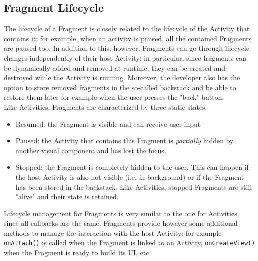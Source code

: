 \documentclass[11pt,a4paper,notitlepage]{article}
\begin{document}
\subsection{Fragment Lifecycle}
The lifecycle of a Fragment is closely related to the lifecycle of the Activity that contains it: for example, when an activity is paused, all the contained Fragments are paused too. In addition to this, however, Fragments can go through lifecycle changes independently of their host Activity: in particular, since fragments can be dynamically added and removed at runtime, they can be created and destroyed while the Activity is running. Moreover, the developer also has the option to store removed fragments in the so-called backstack and be able to restore them later for example when the user presses the "back" button.\smallskip \\
Like Activities, Fragments are characterized by three static states:
\begin{itemize}
	\item Resumed: the Fragment is visible and can receive user input
	\item Paused: the Activity that contains this Fragment is \textit{partially} hidden by another visual component and has lost the focus.
	\item Stopped: the Fragment is completely hidden to the user. This can happen if the host Activity is also not visible (i.e. in background) or if the Fragment has been stored in the backstack. Like Activities, stopped Fragments are still "alive" and their state is retained.
\end{itemize}
Lifecycle management for Fragments is very similar to the one for Activities, since all callbacks are the same. Fragments provide however some additional methods to manage the interaction with the host Activity: for example \texttt{onAttach()} is called when the Fragment is linked to an Activity, \texttt{onCreateView()} when the Fragment is ready to build its UI, etc.
\end{document}
